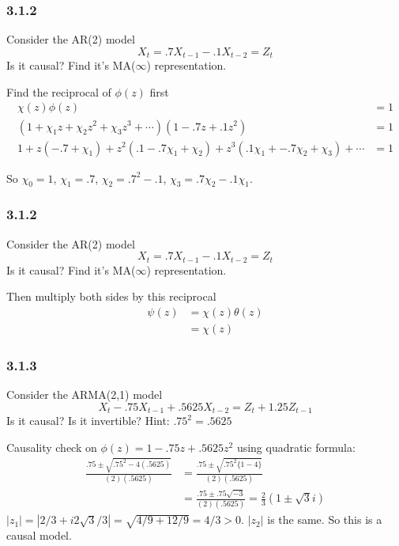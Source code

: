\documentclass{beamer}
\begin{document}

\begin{frame}
\frametitle{3.1.2}
Consider the AR(2) model 
\[
X_t = .7 X_{t-1} - .1X_{t-2} = Z_t 
\]
Is it causal? Find it's MA($\infty$) representation.
\pause
\newline

Find the reciprocal of $\phi(z)$ first
\begin{align*}
\chi(z)\phi(z) &= 1\\
(1 + \chi_1 z + \chi_2 z^2 + \chi_3 z^3 + \cdots)(1 - .7z + .1 z^2 ) &= 1 \\
1 + z(-.7 + \chi_1) + z^2(.1 - .7\chi_1 + \chi_2) + z^3(.1 \chi_1 + -.7 \chi_2 + \chi_3) + \cdots &= 1
\end{align*}

So $\chi_0 = 1$, $\chi_1 = .7$, $\chi_2 = .7^2 -.1 $, $\chi_3 = .7 \chi_2  - .1 \chi_1$.
\end{frame}


\begin{frame}
\frametitle{3.1.2}
Consider the AR(2) model 
\[
X_t = .7 X_{t-1} - .1X_{t-2} = Z_t 
\]
Is it causal? Find it's MA($\infty$) representation.
\newline

Then multiply both sides by this reciprocal 
\begin{align*}
\psi(z) &= \chi(z)\theta(z)\\
&= \chi(z)
\end{align*}


\end{frame}


\begin{frame}
\frametitle{3.1.3}
Consider the ARMA(2,1) model 
\[
X_t - .75 X_{t-1} + .5625 X_{t-2} = Z_t + 1.25 Z_{t-1} 
\]
Is it causal? Is it invertible? Hint: $.75^2 = .5625$
\pause
\newline

Causality check on $\phi(z) = 1 - .75 z + .5625 z^2$ using quadratic formula:
\begin{align*}
\frac{.75 \pm \sqrt{.75^2 - 4(.5625) }}{(2)(.5625)} &= \frac{.75 \pm \sqrt{.75^2\{1 - 4\} }}{(2)(.5625)} \\
&= \frac{.75 \pm .75 \sqrt{-3 }}{(2)(.5625)} = \frac{2}{3}(1 \pm \sqrt{3}i)
\end{align*}
$|z_1| = |2/3 + i 2\sqrt{3}/3| = \sqrt{4/9 + 12/9} = 4/3 > 0$. $|z_2|$ is the same. So this is a causal model.

\end{frame}
\end{document}
